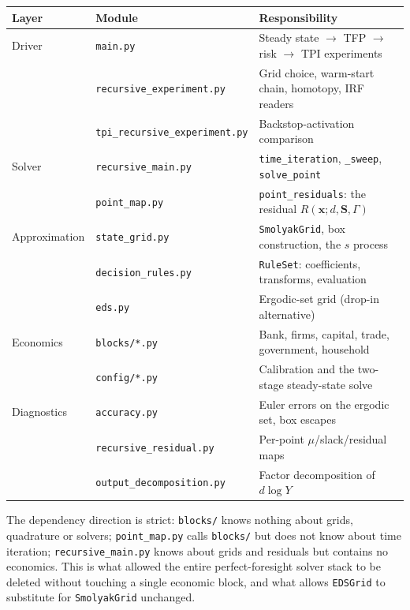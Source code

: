 \documentclass[11pt]{article}
\numberwithin{equation}{section}
\newcommand{\code}[1]{\texttt{\small #1}}
\newcommand{\bx}{\mathbf{x}}
\newcommand{\bS}{\mathbf{S}}
\theoremstyle{definition}
\theoremstyle{plain}
\theoremstyle{remark}
\begin{document}
\begin{center}\small
\begin{tabular}{@{}llp{7.4cm}@{}}
\toprule
Layer & Module & Responsibility \\
\midrule
Driver        & \code{main.py}                     & Steady state $\to$ TFP $\to$ risk $\to$ TPI experiments \\
              & \code{recursive\_experiment.py}    & Grid choice, warm-start chain, homotopy, IRF readers \\
              & \code{tpi\_recursive\_experiment.py} & Backstop-activation comparison \\
\addlinespace
Solver        & \code{recursive\_main.py}          & \code{time\_iteration}, \code{\_sweep}, \code{solve\_point} \\
              & \code{point\_map.py}               & \code{point\_residuals}: the residual $R(\bx;d,\bS,\Gamma)$ \\
\addlinespace
Approximation & \code{state\_grid.py}              & \code{SmolyakGrid}, box construction, the $s$ process \\
              & \code{decision\_rules.py}          & \code{RuleSet}: coefficients, transforms, evaluation \\
              & \code{eds.py}                      & Ergodic-set grid (drop-in alternative) \\
\addlinespace
Economics     & \code{blocks/*.py}                 & Bank, firms, capital, trade, government, household \\
              & \code{config/*.py}                 & Calibration and the two-stage steady-state solve \\
\addlinespace
Diagnostics   & \code{accuracy.py}                 & Euler errors on the ergodic set, box escapes \\
              & \code{recursive\_residual.py}      & Per-point $\mu$/slack/residual maps \\
              & \code{output\_decomposition.py}    & Factor decomposition of $d\log Y$ \\
\bottomrule
\end{tabular}
\end{center}

The dependency direction is strict: \code{blocks/} knows nothing about grids,
quadrature or solvers; \code{point\_map.py} calls \code{blocks/} but does not know
about time iteration; \code{recursive\_main.py} knows about grids and residuals but
contains no economics. This is what allowed the entire perfect-foresight solver stack
to be deleted without touching a single economic block, and what allows
\code{EDSGrid} to substitute for \code{SmolyakGrid} unchanged.
\end{document}
